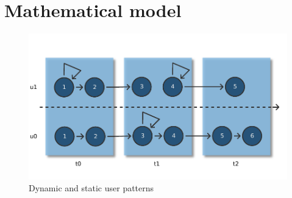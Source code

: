 \newpage

\section{Mathematical model}
\label{sec:math_model}

\begin{figure}[h]
\begin{center}
\includegraphics[scale = 1.0] {mathematical_definition/images/dynamic_users.pdf}
\caption{Dynamic and static user patterns}
\label{fig:matehematical_model}
\end{center}
\end{figure}


